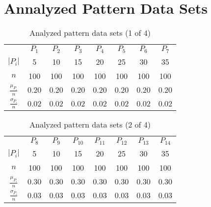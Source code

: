 \documentclass[anon]{CI}
\begin{document}




\appendix

\section{Annalyzed Pattern Data Sets}\label{AppA}



\begin{table}[H]
	\centering
	\def\arraystretch{1.5}
	\begin{tabular}{cccccccc}
		
		& $P_{1}$  & $P_{2}$  & $P_{3}$  & $P_{4}$  & $P_{5}$  & $P_{6}$  & $P_{7}$  \\ \cline{2-8}
		$\left|P_i\right|$  & 5  & 10  & 15  & 20  & 25  & 30  & 35 \\
		$n$  & 100  & 100  & 100  & 100  & 100  & 100  & 100 \\
		$\frac{\mu_{P_i}}{n}$  & $0.20$  & $0.20$  & $0.20$  & $0.20$  & $0.20$  & $0.20$  & $0.20$ \\
		$\frac{\sigma_{P_i}}{n}$  & $0.02$  & $0.02$  & $0.02$  & $0.02$  & $0.02$  & $0.02$  & $0.02$ 
	\end{tabular}
	\caption{Analyzed pattern data sets (1 of 4)}
\end{table}


\begin{table}[H]
	\centering
	\def\arraystretch{1.5}
	\begin{tabular}{cccccccc}
		
		& $P_{8}$  & $P_{9}$  & $P_{10}$  & $P_{11}$  & $P_{12}$  & $P_{13}$  & $P_{14}$  \\ \cline{2-8}
		$\left|P_i\right|$  & 5  & 10  & 15  & 20  & 25  & 30  & 35 \\
		$n$  & 100  & 100  & 100  & 100  & 100  & 100  & 100 \\
		$\frac{\mu_{P_i}}{n}$  & $0.30$  & $0.30$  & $0.30$  & $0.30$  & $0.30$  & $0.30$  & $0.30$ \\
		$\frac{\sigma_{P_i}}{n}$  & $0.03$  & $0.03$  & $0.03$  & $0.03$  & $0.03$  & $0.03$  & $0.03$ 
	\end{tabular}
	\caption{Analyzed pattern data sets (2 of 4)}
\end{table}
\end{document}
